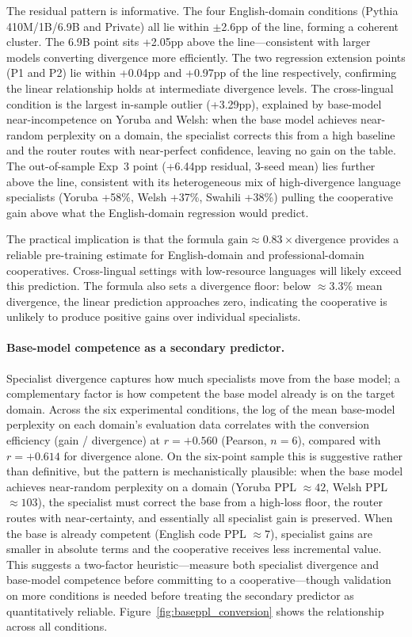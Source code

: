 \documentclass{article}
\begin{document}
The residual pattern is informative. The four English-domain conditions (Pythia 410M/1B/6.9B and Private) all lie within $\pm$2.6pp of the line, forming a coherent cluster. The 6.9B point sits +2.05pp above the line---consistent with larger models converting divergence more efficiently. The two regression extension points (P1 and P2) lie within +0.04pp and +0.97pp of the line respectively, confirming the linear relationship holds at intermediate divergence levels. The cross-lingual condition is the largest in-sample outlier (+3.29pp), explained by base-model near-incompetence on Yoruba and Welsh: when the base model achieves near-random perplexity on a domain, the specialist corrects this from a high baseline and the router routes with near-perfect confidence, leaving no gain on the table. The out-of-sample Exp~3 point (+6.44pp residual, 3-seed mean) lies further above the line, consistent with its heterogeneous mix of high-divergence language specialists (Yoruba +58\%, Welsh +37\%, Swahili +38\%) pulling the cooperative gain above what the English-domain regression would predict.

The practical implication is that the formula $\text{gain} \approx 0.83 \times \text{divergence}$ provides a reliable pre-training estimate for English-domain and professional-domain cooperatives. Cross-lingual settings with low-resource languages will likely exceed this prediction. The formula also sets a divergence floor: below $\approx$3.3\% mean divergence, the linear prediction approaches zero, indicating the cooperative is unlikely to produce positive gains over individual specialists.

\paragraph{Base-model competence as a secondary predictor.}
Specialist divergence captures how much specialists move from the base model; a complementary factor is how competent the base model already is on the target domain. Across the six experimental conditions, the log of the mean base-model perplexity on each domain's evaluation data correlates with the conversion efficiency (gain / divergence) at $r = +0.560$ (Pearson, $n = 6$), compared with $r = +0.614$ for divergence alone. On the six-point sample this is suggestive rather than definitive, but the pattern is mechanistically plausible: when the base model achieves near-random perplexity on a domain (Yoruba PPL $\approx 42$, Welsh PPL $\approx 103$), the specialist must correct the base from a high-loss floor, the router routes with near-certainty, and essentially all specialist gain is preserved. When the base is already competent (English code PPL $\approx 7$), specialist gains are smaller in absolute terms and the cooperative receives less incremental value. This suggests a two-factor heuristic---measure both specialist divergence and base-model competence before committing to a cooperative---though validation on more conditions is needed before treating the secondary predictor as quantitatively reliable. Figure~\ref{fig:baseppl_conversion} shows the relationship across all conditions.
\end{document}
